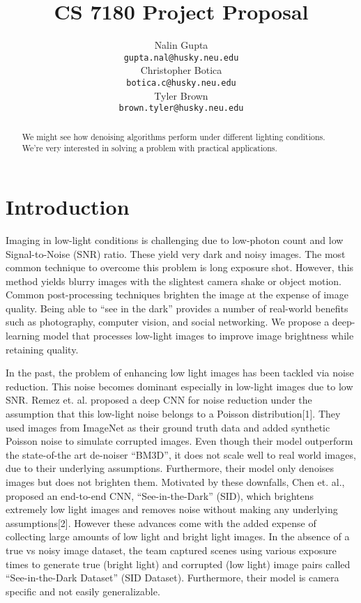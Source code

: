 \documentclass{article}
\title{CS 7180 Project Proposal}
\author{%
  Nalin Gupta \\
  \texttt{gupta.nal@husky.neu.edu} \\
  \And
  Christopher Botica\\
  \texttt{botica.c@husky.neu.edu} \\
  \And
  Tyler Brown\\
  \texttt{brown.tyler@husky.neu.edu} \\
}
\begin{document}

\maketitle

\begin{abstract}
  We might see how denoising algorithms perform under different lighting
  conditions. We're very interested in solving a problem with practical
  applications. 
\end{abstract}

\section{Introduction}

Imaging in low-light conditions is challenging due to low-photon count
and low Signal-to-Noise (SNR) ratio. These yield very dark and noisy images.
The most common technique to overcome this problem is long exposure shot.
However, this method yields blurry images with the slightest camera shake
or object motion. Common post-processing techniques brighten the image at
the expense of image quality. Being able to “see in the dark” provides a
number of real-world benefits such as photography, computer vision, and
social networking. We propose a deep-learning model that processes low-light
images to improve image brightness while retaining quality.


In the past, the problem of enhancing low light images has been tackled via
noise reduction. This noise becomes dominant especially in low-light images
due to low SNR. Remez et. al. proposed a deep CNN for noise reduction under
the assumption that this low-light noise belongs to a Poisson
distribution[1].  They used images from ImageNet as their ground truth data
and added synthetic Poisson noise to simulate corrupted images. Even though
their model outperform the state-of-the art de-noiser “BM3D”, it does not
scale well to real world images, due to their underlying assumptions.
Furthermore, their model only denoises images but does not brighten them.
Motivated by these downfalls, Chen et. al., proposed an end-to-end CNN,
“See-in-the-Dark” (SID), which brightens extremely low light images and
removes noise without making any underlying assumptions[2]. However these
advances come with the added expense of collecting large amounts of low
light and bright light images. In the absence of a true vs noisy image
dataset, the team captured scenes using various exposure times to generate
true (bright light) and corrupted (low light) image pairs called
“See-in-the-Dark Dataset” (SID Dataset). Furthermore, their model is camera
specific and not easily generalizable.
\end{document}
